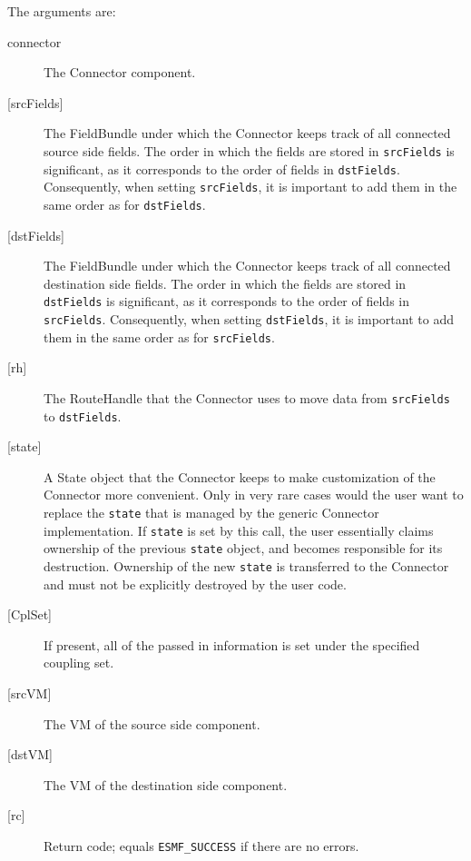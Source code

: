      The arguments are:
     \begin{description}
     \item[connector]
       The Connector component.
     \item[{[srcFields]}]
       The FieldBundle under which the Connector keeps track of all connected
       source side fields. The order in which the fields are stored
       in {\tt srcFields} is significant, as it corresponds to the order of
       fields in {\tt dstFields}. Consequently, when setting {\tt srcFields}, it
       is important to add them in the same order as for {\tt dstFields}.
     \item[{[dstFields]}]
       The FieldBundle under which the Connector keeps track of all connected
       destination side fields. The order in which the fields are stored
       in {\tt dstFields} is significant, as it corresponds to the order of
       fields in {\tt srcFields}. Consequently, when setting {\tt dstFields}, it
       is important to add them in the same order as for {\tt srcFields}.
     \item[{[rh]}]
       The RouteHandle that the Connector uses to move data from {\tt srcFields}
       to {\tt dstFields}.
     \item[{[state]}]
       A State object that the Connector keeps to make customization of the 
       Connector more convenient. Only in very rare cases would the user want
       to replace the {\tt state} that is managed by the generic Connector
       implementation. If {\tt state} is set by this call, the user essentially
       claims ownership of the previous {\tt state} object, and becomes 
       responsible for its destruction. Ownership of the new {\tt state} is 
       transferred to the Connector and must not be explicitly destroyed by the
       user code.
     \item[{[CplSet]}]
       If present, all of the passed in information is set under the specified
       coupling set.
     \item[{[srcVM]}]
       The VM of the source side component.
     \item[{[dstVM]}]
       The VM of the destination side component.
     \item[{[rc]}]
       Return code; equals {\tt ESMF\_SUCCESS} if there are no errors.
     \end{description}
  
\setlength{\parskip}{\oldparskip}
\setlength{\parindent}{\oldparindent}
\setlength{\baselineskip}{\oldbaselineskip}

